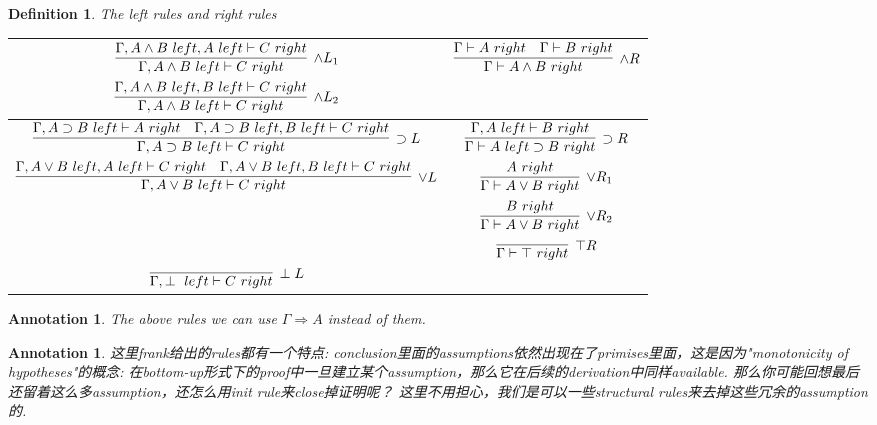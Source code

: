 \documentclass{article}
\theoremstyle{plain}
\newtheorem{definition}[theorem]{Definition}
\newtheorem{annotation}[theorem]{Annotation}
\theoremstyle{nonumberplain}
\begin{document}
\begin{definition}
\rm The left rules and right rules
\begin{center}
\begin{tabular}{|c|c|}
\hline
$\begin{aligned} \infer[\wedge L_1]{\Gamma, A \wedge B~left \vdash C~right}{\Gamma, A \wedge B~left, A~left \vdash C~right}\\ \infer[\wedge L_2]{\Gamma, A \wedge B~left \vdash C~right}{\Gamma, A \wedge B~left, B~left \vdash C~right}\end{aligned}$ &  $\infer[\wedge R]{\Gamma \vdash A \wedge B ~right}{\Gamma \vdash A~right & \Gamma \vdash B~right}$ \rule{0mm}{15mm}\\
\hline
$\infer[\supset L]{\Gamma, A \supset B~left \vdash C~right}{\Gamma, A \supset B~left \vdash A~right & \Gamma, A \supset B~left, B~left \vdash C~right}$ & $\infer[\supset R]{\Gamma \vdash A~left \supset B~right}{\Gamma, A~left \vdash B~right}$ \rule{0mm}{10mm} \\
\hline
 $\infer[\vee L]{\Gamma, A \vee B~left \vdash C~right}{\Gamma, A \vee B~left,A~left \vdash C~right & \Gamma, A \vee B~left, B~left \vdash C~right}$ & $\begin{aligned}\infer[\vee R_1]{\Gamma\vdash A \vee B~right}{A~right} \\ \infer[\vee R_2]{\Gamma\vdash A \vee B~right}{B~right} \end{aligned}$ \rule{0mm}{15mm} \\
\hline
& $\infer[\top R]{\Gamma \vdash \top~right}{}$ \rule{0mm}{10mm}  \\
\hline
$\infer[\perp L]{\Gamma,\perp~left \vdash C~right}{}$ & \rule{0mm}{10mm}\\
\hline
\end{tabular}
\end{center}
\end{definition}

\begin{annotation}
\rm The above rules we can use $\Gamma \Rightarrow A$ instead of them.
\end{annotation}

\begin{annotation}
\rm 这里frank给出的rules都有一个特点: conclusion里面的assumptions依然出现在了primises里面，这是因为"monotonicity of hypotheses"的概念: 在bottom-up形式下的proof中一旦建立某个assumption，那么它在后续的derivation中同样available. 那么你可能回想最后还留着这么多assumption，还怎么用init rule来close掉证明呢？ 这里不用担心，我们是可以一些structural rules来去掉这些冗余的assumption的. 
\end{annotation}
\end{document}
